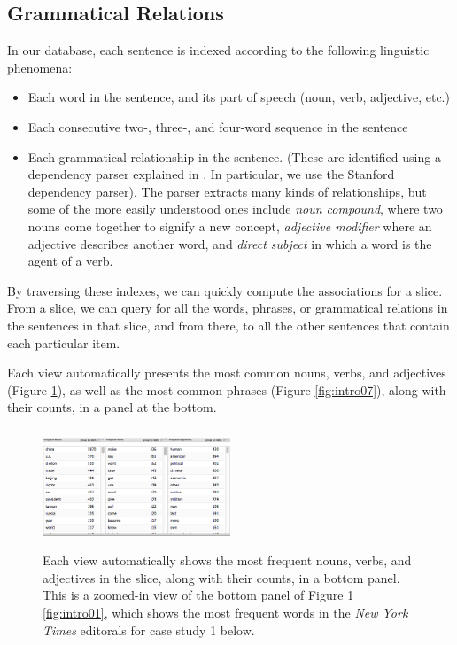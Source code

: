 \documentclass{sig-alternate}
\begin{document}
\subsection{Grammatical Relations}

 In our database, each sentence is indexed according to the following linguistic phenomena:
\begin{itemize}
  \item Each word in the sentence, and its part of speech (noun, verb, adjective, etc.)
  \item Each consecutive two-, three-, and four-word sequence in the sentence
  \item Each grammatical relationship in the sentence. (These are identified using a dependency parser  explained in \cite{jurafsky_chapter_2009}. In particular, we use the Stanford dependency parser\cite{klein_accurate_2003}).  The parser extracts many kinds of relationships, but some of the more easily understood ones include \emph{noun compound}, where two nouns come together to signify a new concept, \emph{adjective modifier} where an adjective describes another word, and \emph{direct subject} in which a word is the agent of a verb.
  
\end{itemize}
By traversing these indexes, we can quickly compute the associations for a slice. From a slice, we can query for all the words, phrases, or grammatical relations in the sentences in that slice, and from there, to all the other sentences that contain each particular item.  


Each view automatically presents the most common nouns, verbs, and adjectives (Figure \ref{fig:intro06}), as well as the most common phrases (Figure \ref{fig:intro07}), along with their counts, in a panel at the bottom.    
\begin{figure}[ht!]
\begin{center}
	\includegraphics[width=0.5\textwidth]{fig/intro/06a.png}
	\includegraphics[width=0.5\textwidth]{fig/intro/06.png}
\end{center}
    \caption{%
        Each view automatically shows the most frequent nouns, verbs, and adjectives in the slice, along with their counts, in a bottom panel. This is a zoomed-in view of the bottom panel of Figure 1 \ref{fig:intro01}, which shows the most frequent words in the \emph{New York Times} editorals for case study 1 below.  \label{fig:intro06}
     }%
\end{figure}
\end{document}
